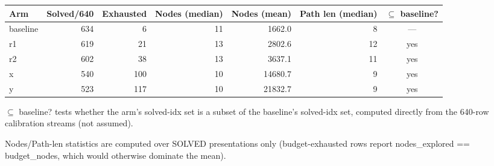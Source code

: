 \begin{tabular}{lrrrrrc}
\toprule
Arm & Solved/640 & Exhausted & Nodes (median) & Nodes (mean) & Path len (median) & $\subseteq$ baseline? \\
\midrule
baseline & 634 & 6 & 11 & 1662.0 & 8 & --- \\
r1 & 619 & 21 & 13 & 2802.6 & 12 & yes \\
r2 & 602 & 38 & 13 & 3637.1 & 11 & yes \\
x & 540 & 100 & 10 & 14680.7 & 9 & yes \\
y & 523 & 117 & 10 & 21832.7 & 9 & yes \\
\bottomrule
\end{tabular}

\vspace{2pt}
{\footnotesize
$\subseteq$ baseline? tests whether the arm's solved-idx set is a subset of the baseline's solved-idx set, computed directly from the 640-row calibration streams (not assumed).\par
Nodes/Path-len statistics are computed over SOLVED presentations only (budget-exhausted rows report nodes\_explored == budget\_nodes, which would otherwise dominate the mean).\par
}
